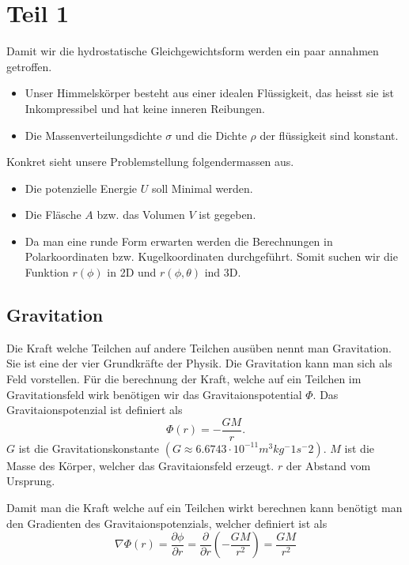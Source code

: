 %
%
%
%
\section{Teil 1
\label{planet:section:teil1}}
Damit wir die hydrostatische Gleichgewichtsform werden ein paar annahmen getroffen.
\begin{itemize}
	\item Unser Himmelskörper besteht aus einer idealen Flüssigkeit, das heisst sie ist Inkompressibel und hat keine inneren Reibungen.
	\item Die Massenverteilungsdichte \(\sigma\) und die Dichte \(\rho\) der flüssigkeit sind konstant.	
\end{itemize}

Konkret sieht unsere Problemstellung folgendermassen aus.
\begin{itemize}
	\item Die potenzielle Energie \(U\) soll Minimal werden.
	\item Die Fläsche \(A\) bzw. das Volumen \(V\) ist gegeben.
	\item Da man eine runde Form erwarten werden die Berechnungen in Polarkoordinaten bzw. Kugelkoordinaten durchgeführt. Somit suchen wir die Funktion \(r(\phi)\) in 2D und \(r(\phi,\theta)\) ind 3D.
\end{itemize}

\subsection{Gravitation}

Die Kraft welche Teilchen auf andere Teilchen ausüben nennt man Gravitation.
Sie ist eine der vier Grundkräfte der Physik.
Die Gravitation kann man sich als Feld vorstellen.
Für die berechnung der Kraft, welche auf ein Teilchen im Gravitationsfeld wirk benötigen wir das Gravitaionspotential \(\Phi\).
Das Gravitaionspotenzial ist definiert als
\begin{equation}
	\Phi(r) = -\frac{GM}{r}.
	\label{planet:equ:gravpot}
\end{equation}
\(G\) ist die Gravitationskonstante \((G \approx 6.6743 \cdot 10^{-11} m^3 kg^-1 s^-2)\).
\(M\) ist die Masse des Körper, welcher das Gravitaionsfeld erzeugt.
\(r\) der Abstand vom Ursprung.

Damit man die Kraft welche auf ein Teilchen wirkt berechnen kann benötigt man den Gradienten des Gravitaionspotenzials, welcher definiert ist als
\begin{equation}
	\nabla \Phi (r) = \frac{\partial \phi}{\partial r} = \frac{\partial}{\partial r} (-\frac{GM}{r^2}) = \frac{GM}{r^2}
\end{equation}

